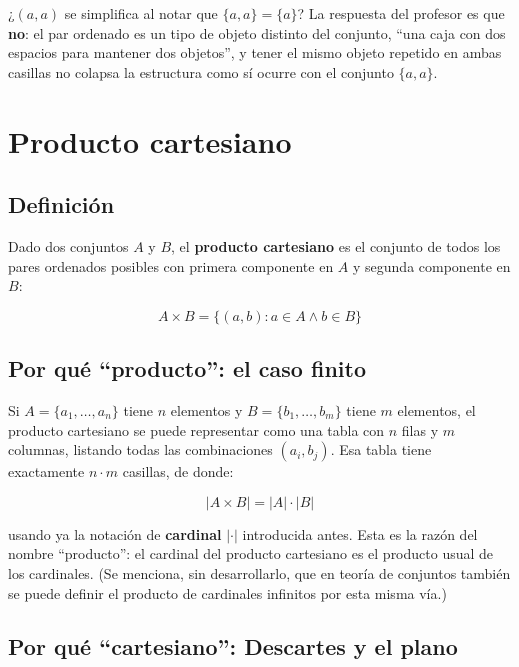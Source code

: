 \documentclass[12pt,a4paper]{article}
\begin{document}
\begin{notebox}
¿$(a,a)$ se simplifica al notar que $\{a,a\}=\{a\}$? La respuesta del profesor es que \textbf{no}: el par ordenado es un tipo de objeto distinto del conjunto, ``una caja con dos espacios para mantener dos objetos'', y tener el mismo objeto repetido en ambas casillas no colapsa la estructura como sí ocurre con el conjunto $\{a,a\}$.
\end{notebox}

\section{Producto cartesiano}

\subsection{Definición}

Dado dos conjuntos $A$ y $B$, el \textbf{producto cartesiano} es el conjunto de todos los pares ordenados posibles con primera componente en $A$ y segunda componente en $B$:

\begin{keybox}
$$\boxed{A \times B = \{(a,b) : a \in A \wedge b \in B\}}$$
\end{keybox}

\subsection{Por qué ``producto'': el caso finito}

Si $A = \{a_1,\dots,a_n\}$ tiene $n$ elementos y $B=\{b_1,\dots,b_m\}$ tiene $m$ elementos, el producto cartesiano se puede representar como una tabla con $n$ filas y $m$ columnas, listando todas las combinaciones $(a_i,b_j)$. Esa tabla tiene exactamente $n\cdot m$ casillas, de donde:

\begin{keybox}
$$\boxed{|A \times B| = |A| \cdot |B|}$$
\end{keybox}

usando ya la notación de \textbf{cardinal} $|\cdot|$ introducida antes. Esta es la razón del nombre ``producto'': el cardinal del producto cartesiano es el producto usual de los cardinales. (Se menciona, sin desarrollarlo, que en teoría de conjuntos también se puede definir el producto de cardinales infinitos por esta misma vía.)

\subsection{Por qué ``cartesiano'': Descartes y el plano}
\end{document}
